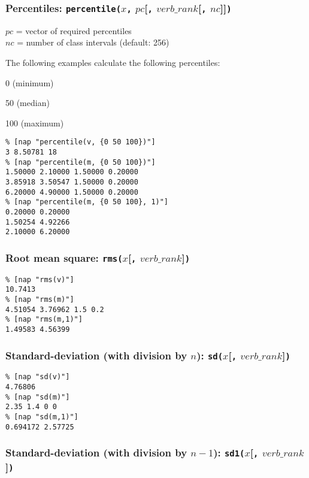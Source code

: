 \subsubsection{Percentiles:
\texttt{percentile(}$x$\texttt{,} $pc$[\texttt{,} $\mathit{verb\_rank}$[\texttt{,} $nc$]]\texttt{)}}
    \label{stat-percentile}

  $pc$ = vector of required percentiles
  \\
  $nc$ = number of class intervals (default: 256)

The following examples calculate the following percentiles:
\begin{bullets}
    \item 0 (minimum)
    \item 50 (median)
    \item 100 (maximum)
\end{bullets}
\begin{verbatim}
% [nap "percentile(v, {0 50 100})"]
3 8.50781 18
% [nap "percentile(m, {0 50 100})"]
1.50000 2.10000 1.50000 0.20000
3.85918 3.50547 1.50000 0.20000
6.20000 4.90000 1.50000 0.20000
% [nap "percentile(m, {0 50 100}, 1)"]
0.20000 0.20000
1.50254 4.92266
2.10000 6.20000
\end{verbatim}

\subsubsection{Root mean square: \texttt{rms(}$x$[\texttt{,} $\mathit{verb\_rank}$]\texttt{)}}
    \label{stat-rms}

  \begin{verbatim}
% [nap "rms(v)"]
10.7413
% [nap "rms(m)"]
4.51054 3.76962 1.5 0.2
% [nap "rms(m,1)"]
1.49583 4.56399
\end{verbatim}

\subsubsection{Standard-deviation (with division by $n$):
\texttt{sd(}$x$[\texttt{,} $\mathit{verb\_rank}$]\texttt{)}}
    \label{stat-sd}

  \begin{verbatim}
% [nap "sd(v)"]
4.76806
% [nap "sd(m)"]
2.35 1.4 0 0
% [nap "sd(m,1)"]
0.694172 2.57725
\end{verbatim}

\subsubsection{Standard-deviation (with division by $n-1$):
\texttt{sd1(}$x$[\texttt{,} $\mathit{verb\_rank}$]\texttt{)}}
    \label{stat-sd1}

